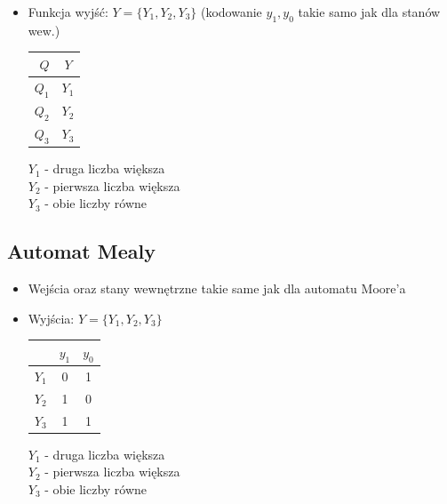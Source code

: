\documentclass[12pt,a4paper]{article}
\begin{document}
\begin{itemize}
			\item Funkcja wyjść: \(Y=\{Y_1, Y_2, Y_3\}\) (kodowanie \(y_1,y_0\) takie samo jak dla stanów wew.)\\
			
			\begin{minipage}{{.5\textwidth}}
				\centering
				\begin{tabular}{r|c}
					\(Q\)	&	\(Y\)	\\\hline
					\(Q_1\)	&	\(Y_1\)	\\
					\(Q_2\)	&	\(Y_2\)	\\
					\(Q_3\)	&	\(Y_3\)	\\
				\end{tabular}
			\end{minipage}%
			\begin{minipage}{{.5\textwidth}}	
				\(Y_1\) - druga liczba większa\\
				\(Y_2\) - pierwsza liczba większa\\
				\(Y_3\) - obie liczby równe\\
			\end{minipage}
		\end{itemize}
		
		\subsection{Automat Mealy}
		\begin{itemize}
			\item Wejścia oraz stany wewnętrzne takie same jak dla automatu Moore'a
			
			\item Wyjścia: \(Y=\{Y_1, Y_2, Y_3\}\)\\
			
			\begin{minipage}{{.5\textwidth}}
				\centering
				\begin{tabular}{r|cc}
					&	\(y_1\)	&	\(y_0\)\\\hline
					\(Y_1\)	&	0	&	1	\\
					\(Y_2\)	&	1	&	0	\\
					\(Y_3\)	&	1	&	1	\\
				\end{tabular}
			\end{minipage}%
			\begin{minipage}{{.5\textwidth}}	
				\(Y_1\) - druga liczba większa\\
				\(Y_2\) - pierwsza liczba większa\\
				\(Y_3\) - obie liczby równe\\
			\end{minipage}
		\end{itemize}
		
\end{document}
